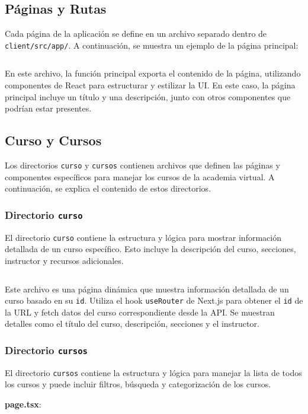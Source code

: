 \subsection{Páginas y Rutas}
Cada página de la aplicación se define en un archivo separado dentro de \texttt{client/src/app/}. A continuación, se muestra un ejemplo de la página principal:

\inputminted{typescript}{../client/src/app/page.tsx}

En este archivo, la función principal exporta el contenido de la página, utilizando componentes de React para estructurar y estilizar la UI. En este caso, la página principal incluye un título y una descripción, junto con otros componentes que podrían estar presentes.

\subsection{Curso y Cursos}
Los directorios \texttt{curso} y \texttt{cursos} contienen archivos que definen las páginas y componentes específicos para manejar los cursos de la academia virtual. A continuación, se explica el contenido de estos directorios.

\subsubsection{Directorio \texttt{curso}}
El directorio \texttt{curso} contiene la estructura y lógica para mostrar información detallada de un curso específico. Esto incluye la descripción del curso, secciones, instructor y recursos adicionales.

\inputminted{typescript}{../client/src/app/[cursoID]/page.tsx}

Este archivo es una página dinámica que muestra información detallada de un curso basado en su \texttt{id}. Utiliza el hook \texttt{useRouter} de Next.js para obtener el \texttt{id} de la URL y fetch datos del curso correspondiente desde la API. Se muestran detalles como el título del curso, descripción, secciones y el instructor.

\subsubsection{Directorio \texttt{cursos}}
El directorio \texttt{cursos} contiene la estructura y lógica para manejar la lista de todos los cursos y puede incluir filtros, búsqueda y categorización de los cursos.

\textbf{page.tsx}:
\inputminted{typescript}{../client/src/app/cursos/page.tsx}


